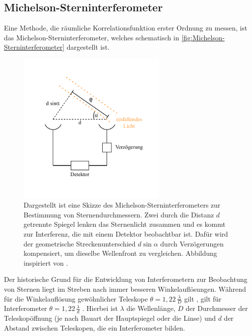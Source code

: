 \subsection{Michelson-Sterninterferometer}
\label{ssec:Michelson-Sterninterferometer}
Eine Methode, die räumliche Korrelationsfunktion erster Ordnung zu messen, ist das Michelson-Sterninterferometer, welches schematisch in \autoref{fig:Michelson-Sterninterferometer} dargestellt ist. 
\begin{figure}[h]
    \centering
    \includegraphics[width=0.65\textwidth]{images/Theorie/Michelson_Interferometer.pdf}
    \caption{Dargestellt ist eine Skizze des Michelson-Sterninterferometers zur Bestimmung von Sternendurchmessern. Zwei durch die Distanz $d$ getrennte Spiegel lenken das Sternenlicht zusammen und es kommt zur Interferenz, die mit einem Detektor beobachtbar ist. Dafür wird der geometrische Streckenunterschied $d\sin\alpha$ durch Verzögerungen kompensiert, um dieselbe Wellenfront zu vergleichen. Abbildung inspiriert von \cite[Abb. 1]{foellmiIntensityInterferometrySecondorder2009}.}
    \label{fig:Michelson-Sterninterferometer}
\end{figure}
Der historische Grund für die Entwicklung von Interferometern zur Beobachtung von Sternen liegt im Streben nach immer besseren Winkelauflösungen. 
Während für die Winkelauflösung gewöhnlicher Teleskope $\theta = 1{,}22\, \frac{\lambda}{D}$ gilt \cite[Gl. 5.6]{hanslmeierAstronomischeInstrumente2020}, gilt für Interferometer $\theta = 1{,}22\, \frac{\lambda}{d}$ \cite[Gl. 6.2]{foxQuantumOpticsIntroduction2006}. 
Hierbei ist $\lambda$ die Wellenlänge, $D$ der Durchmesser der Teleskopöffnung (je nach Bauart der Hauptspiegel oder die Linse) und $d$ der Abstand zwischen Teleskopen, die ein Interferometer bilden. 
